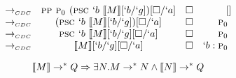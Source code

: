 \begin{Proof}
\[\begin{array}{lcrr}
  \tocdc\     & \pp \gp (\psc `b\ \tr{M}[`b/`g])[\square/`a]     & \square & []        \\
  \tocdc\     & (\psc `b\ \tr{M}[`b/`g])[\square/`a]             & \square & \gp       \\
  \tocdc\     & \psc `b\ \tr{M}[`b/`g][\square/`a]               & \square & \gp       \\
  \tocdc\     & \tr{M}[`b/`g][\square/`a]                        & \square & `b:\gp \\
\end{array}
\]
\end{Proof}

\begin{theorem}[Completeness of $\tr{`.}$]
\[
  \llbracket M \rrbracket \to^{*} Q \Rightarrow \exists N. M \to^{*} N \land \llbracket N \rrbracket \to^{*} Q
\]
\end{theorem}
